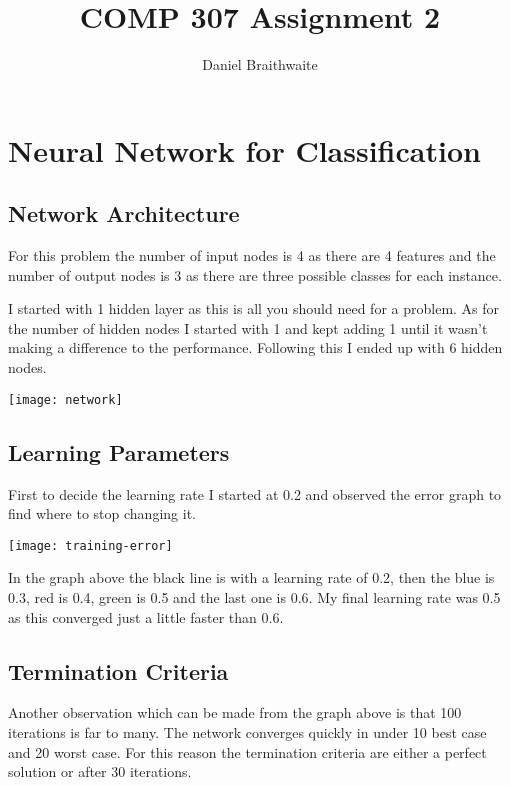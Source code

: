 \documentclass[a4paper, 12pt]{article}
\title{COMP 307 Assignment 2}
\author{Daniel Braithwaite}
\begin{document}
	\maketitle
	\newpage
  	
	\section{Neural Network for Classification}
		\subsection{Network Architecture}
			For this problem the number of input nodes is 4 as there are 4 features and the number of output nodes is 3 as there are three possible classes for each instance.
			
			I started with 1 hidden layer as this is all you should need for a problem. As for the number of hidden nodes I started with 1 and kept adding 1 until it wasn't making a difference to the performance. Following this I ended up with 6 hidden nodes.
			
			\begin{center}
				\texttt{[image: network]}
			\end{center}
		
		\subsection{Learning Parameters}
			First to decide the learning rate I started at 0.2 and observed the error graph to find where to stop changing it.
			
			\begin{center}
				\texttt{[image: training-error]}
			\end{center}
			
			In the graph above the black line is with a learning rate of 0.2, then the blue is 0.3, red is 0.4, green is 0.5 and the last one is 0.6. My final learning rate was 0.5 as this converged just a little faster than 0.6.
			
		\subsection{Termination Criteria}
			Another observation which can be made from the graph above is that 100 iterations is far to many. The network converges quickly in under 10 best case and 20 worst case. For this reason the termination criteria are either a perfect solution or after 30 iterations.			
			
\end{document}
